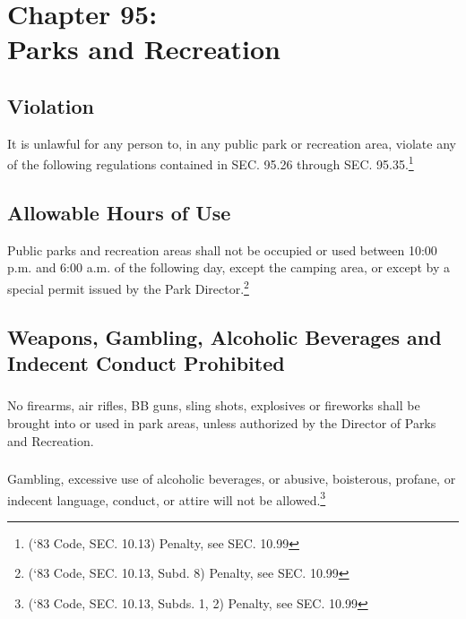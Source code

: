 \chapter*{Chapter 95: \\
	Parks and Recreation}
    \vfill
    \minitoc
    \pagebreak


\setcounter{section}{24}
\section{Violation}
It is unlawful for any person to, in any public park or recreation area, violate any of the following regulations contained in SEC. 95.26 through SEC. 95.35.\footnote{(‘83 Code, SEC. 10.13)  Penalty, see SEC. 10.99}

\section{Allowable Hours of Use}
Public parks and recreation areas shall not be occupied or used between 10:00 p.m. and 6:00 a.m. of the following day, except the camping area, or except by a special permit issued by the Park Director.\footnote{(‘83 Code, SEC. 10.13, Subd. 8) Penalty, see SEC. 10.99}

\section{Weapons, Gambling, Alcoholic Beverages and Indecent Conduct Prohibited}
\subsection{}
No firearms, air rifles, BB guns, sling shots, explosives or fireworks shall be brought into or used in park areas, unless authorized by the Director of Parks and Recreation.
\subsection{}
Gambling, excessive use of alcoholic beverages, or abusive, boisterous, profane, or indecent language, conduct, or attire will not be allowed.\footnote{(‘83 Code, SEC. 10.13, Subds. 1, 2)  Penalty, see SEC. 10.99}

